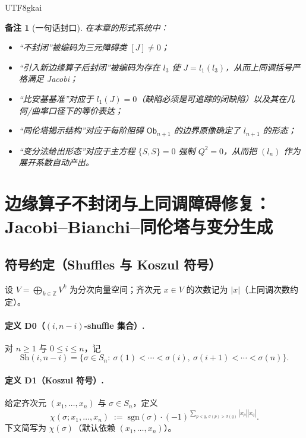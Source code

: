 \documentclass[12pt]{article}
\newtheorem{remark}{备注}[section]
\newcommand{\Ob}{\ensuremath{\mathsf{Ob}}}
\begin{document}
\begin{CJK*}{UTF8}{gkai}
\begin{remark}[一句话封口]
在本章的形式系统中：
\begin{itemize}
  \item “不封闭”被编码为三元障碍类 $[J]\neq 0$；
  \item “引入新边缘算子后封闭”被编码为存在 $l_3$ 使 $J=l_1(l_3)$，从而上同调括号严格满足 Jacobi；
  \item “比安基基准”对应于 $l_1(J)=0$（缺陷必须是可追踪的闭缺陷）以及其在几何/曲率口径下的等价表达；
  \item “同伦塔揭示结构”对应于每阶阻碍 $\Ob_{n+1}$ 的边界原像确定了 $l_{n+1}$ 的形态；
  \item “变分法给出形态”对应于主方程 $\{S,S\}=0$ 强制 $Q^2=0$，从而把 $(l_n)$ 作为展开系数自动产出。
\end{itemize}
\end{remark}

\clearpage

\appendix

\section{边缘算子不封闭与上同调障碍修复：Jacobi--Bianchi--同伦塔与变分生成}
\label{sec:edge-op-cohomology-repair}

\subsection{符号约定（Shuffles 与 Koszul 符号）}
\label{subsec:edge-op-conventions}

设 $V=\bigoplus_{k\in\mathbb{Z}}V^k$ 为分次向量空间；齐次元 $x\in V$ 的次数记为 $|x|$（上同调次数约定）。

\paragraph{定义 D0（$(i,n-i)$-shuffle 集合）.}
对 $n\ge 1$ 与 $0\le i\le n$，记
\[
\mathrm{Sh}(i,n-i)
=\bigl\{\sigma\in S_n:\ \sigma(1)<\cdots<\sigma(i),\ \sigma(i+1)<\cdots<\sigma(n)\bigr\}.
\]

\paragraph{定义 D1（Koszul 符号）.}
给定齐次元 $(x_1,\dots,x_n)$ 与 $\sigma\in S_n$，定义
\[
\chi(\sigma;x_1,\dots,x_n)
\;:=\;\mathrm{sgn}(\sigma)\cdot (-1)^{\sum_{p<q,\ \sigma(p)>\sigma(q)}|x_p||x_q|}.
\]
下文简写为 $\chi(\sigma)$（默认依赖 $(x_1,\dots,x_n)$）。


\end{CJK*}
\end{document}
